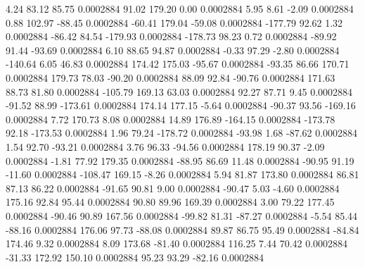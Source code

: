         4.24       83.12       85.75     0.0002884
       91.02      179.20        0.00     0.0002884
        5.95        8.61       -2.09     0.0002884
        0.88      102.97      -88.45     0.0002884
      -60.41      179.04      -59.08     0.0002884
     -177.79       92.62        1.32     0.0002884
      -86.42       84.54     -179.93     0.0002884
     -178.73       98.23        0.72     0.0002884
      -89.92       91.44      -93.69     0.0002884
        6.10       88.65       94.87     0.0002884
       -0.33       97.29       -2.80     0.0002884
     -140.64        6.05       46.83     0.0002884
      174.42      175.03      -95.67     0.0002884
      -93.35       86.66      170.71     0.0002884
      179.73       78.03      -90.20     0.0002884
       88.09       92.84      -90.76     0.0002884
      171.63       88.73       81.80     0.0002884
     -105.79      169.13       63.03     0.0002884
       92.27       87.71        9.45     0.0002884
      -91.52       88.99     -173.61     0.0002884
      174.14      177.15       -5.64     0.0002884
      -90.37       93.56     -169.16     0.0002884
        7.72      170.73        8.08     0.0002884
       14.89      176.89     -164.15     0.0002884
     -173.78       92.18     -173.53     0.0002884
        1.96       79.24     -178.72     0.0002884
      -93.98        1.68      -87.62     0.0002884
        1.54       92.70      -93.21     0.0002884
        3.76       96.33      -94.56     0.0002884
      178.19       90.37       -2.09     0.0002884
       -1.81       77.92      179.35     0.0002884
      -88.95       86.69       11.48     0.0002884
      -90.95       91.19      -11.60     0.0002884
     -108.47      169.15       -8.26     0.0002884
        5.94       81.87      173.80     0.0002884
       86.81       87.13       86.22     0.0002884
      -91.65       90.81        9.00     0.0002884
      -90.47        5.03       -4.60     0.0002884
      175.16       92.84       95.44     0.0002884
       90.80       89.96      169.39     0.0002884
        3.00       79.22      177.45     0.0002884
      -90.46       90.89      167.56     0.0002884
      -99.82       81.31      -87.27     0.0002884
       -5.54       85.44      -88.16     0.0002884
      176.06       97.73      -88.08     0.0002884
       89.87       86.75       95.49     0.0002884
      -84.84      174.46        9.32     0.0002884
        8.09      173.68      -81.40     0.0002884
      116.25        7.44       70.42     0.0002884
      -31.33      172.92      150.10     0.0002884
       95.23       93.29      -82.16     0.0002884
